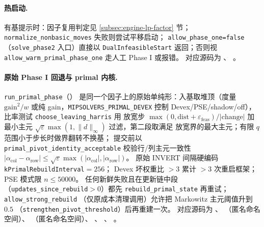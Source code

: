 \paragraph{热启动.}
有基提示时：因子复用判定见 \ref{subsec:engine-lp-factor} 节；
\texttt{normalize\_nonbasic\_moves} 失败则尝试平移启动；
\texttt{allow\_phase\_one=false}（\texttt{solve\_phase2} 入口）直接以
\texttt{DualInfeasibleStart} 返回；否则视
\texttt{allow\_warm\_primal\_phase\_one} 走人工 Phase I 或报错。
对应源码为 、
。

\paragraph{原始 Phase I 回退与 primal 内核.}
\texttt{run\_primal\_phase}（）
是同一个因子上的原始单纯形：入基取堆顶（度量
$\mathrm{gain}^2 / w$ 或纯 gain，\texttt{MIPSOLVERS\_PRIMAL\_DEVEX}
控制 Devex/PSE/shadow/off），比率测试 \texttt{choose\_leaving\_harris} 用
放宽步 $\max(0, \mathrm{dist} + \varepsilon_{\text{feas}})/|\mathrm{change}|$
加最小主元 $\sqrt{\varepsilon}\max(1, \|d\|_{\infty})$ 过滤，第二段取满足
放宽界的最大主元；有限 $q$ 范围小于步长时做界翻转不换基；
提交前以 \texttt{primal\_pivot\_identity\_acceptable} 校验行/列主元一致性
$|\alpha_{\text{col}} - \alpha_{\text{row}}| \le \sqrt{\varepsilon}
\max(|\alpha_{\text{col}}|, |\alpha_{\text{row}}|)$。
原始 INVERT 间隔硬编码 \texttt{kPrimalRebuildInterval}${}=256$；
Devex 坏权重比 $>3$ 累计 $>3$ 次重启框架；PSE 模式限 $n \le 50000$。
任何新鲜失败且在更新链中段（\texttt{updates\_since\_rebuild}$>0$）都先
\texttt{rebuild\_primal\_state} 再重试；\texttt{allow\_strong\_rebuild}
（仅原成本清理调用）允许把 Markowitz 主元阈值升到 $0.5$
（\texttt{strengthen\_pivot\_threshold}）后再重建一次。
对应源码为 、
（匿名命名空间）、
（匿名命名空间）、
、
、
。

